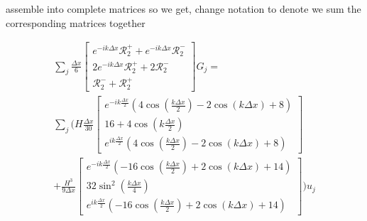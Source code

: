 \documentclass[12pt]{article}
\begin{document}
assemble into complete matrices so we get, change notation to denote we sum the corresponding matrices together

\begin{multline}
\sum_j \frac{\Delta x}{6}\begin{bmatrix} e^{-ik\Delta x} \mathcal{R}^+_2 + e^{-ik\Delta x} \mathcal{R}^-_2   \\2 e^{-ik\Delta x} \mathcal{R}^+_2 +2 \mathcal{R}^-_2 \\ \mathcal{R}^-_2 + \mathcal{R}^+_2 \end{bmatrix} G_j = \\\sum_j \Bigg(H\frac{\Delta x}{30}\begin{bmatrix}e^{-ik\frac{\Delta x}{2}}\left(4\cos\left(\frac{k\Delta x}{2}\right) -2 \cos\left(k \Delta x\right)+8\right)\\16 + 4 \cos\left(k \frac{\Delta x}{2}\right) \\ e^{ik\frac{\Delta x}{2}}\left(4\cos\left(\frac{k\Delta x}{2}\right) -2 \cos\left(k \Delta x\right)+8\right)\end{bmatrix} \\+ \frac{H^3 }{9\Delta x}\begin{bmatrix} e^{-ik\frac{\Delta x}{2}}\left(-16\cos\left(\frac{k\Delta x}{2}\right) + 2\cos\left(k \Delta x\right) + 14\right) \\ 32 \sin^2 \left(\frac{k \Delta x}{4}\right) \\ e^{ik\frac{\Delta x}{2}}\left(-16\cos\left(\frac{k\Delta x}{2}\right) + 2\cos\left(k \Delta x\right) + 14\right) \end{bmatrix}  \Bigg) u_j
\end{multline}
\end{document}
